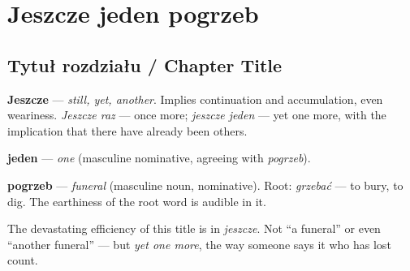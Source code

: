 %
%
%
%
%
%


\chapter{Jeszcze jeden pogrzeb}

\section{Tytuł rozdziału / Chapter Title}


\textbf{Jeszcze} — \textit{still, yet, another}. Implies continuation and 
accumulation, even weariness. \textit{Jeszcze raz} — once more; 
\textit{jeszcze jeden} — yet one more, with the implication that there 
have already been others.

\textbf{jeden} — \textit{one} (masculine nominative, agreeing with \textit{pogrzeb}).

\textbf{pogrzeb} — \textit{funeral} (masculine noun, nominative). 
Root: \textit{grzebać} — to bury, to dig. The earthiness of the root word 
is audible in it.

The devastating efficiency of this title is in \textit{jeszcze}. Not ``a funeral'' 
or even ``another funeral'' — but \textit{yet one more}, the way someone says 
it who has lost count.

